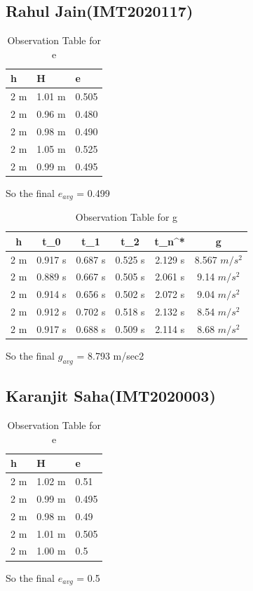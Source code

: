 \documentclass[11pt]{scrartcl} %
\begin{document}
\subsection{Rahul Jain(IMT2020117)}

\begin{table}[h] %
	\centering %
	\begin{tabular}{l l l}
		\toprule
		\textbf{h} & \textbf{H} & \textbf{e} \\
		\midrule
		2 m & 1.01 m & 0.505\\
        2 m & 0.96 m  & 0.480\\
        2 m & 0.98 m  & 0.490\\
        2 m & 1.05 m & 0.525 \\
        2 m & 0.99 m & 0.495 \\
		\bottomrule
	\end{tabular}
	\caption{Observation Table for e}
\end{table}
So the final $e_{avg}$ = 0.499

\begin{table}[h]
\centering
\begin{tabular}{||c c c c c c||} 
\toprule
 \hline
 h & t_0 & t_1 & t_2 & t_n^* & g \\ [0.5ex] 
 \midrule
 \hline\hline
 2 m & 0.917 s & 0.687 s  & 0.525 s & 2.129 s & 8.567 $m/s^2$  \\ 
 \hline
 2 m & 0.889 s & 0.667 s & 0.505 s & 2.061 s & 9.14 $m/s^2$  \\
 \hline 
 2 m & 0.914 s & 0.656 s & 0.502 s & 2.072 s  & 9.04 $m/s^2$   \\
 \hline
 2 m & 0.912 s & 0.702 s & 0.518 s & 2.132 s  & 8.54 $m/s^2$   \\
 \hline
 2 m & 0.917 s & 0.688 s & 0.509 s & 2.114 s  & 8.68 $m/s^2$  \\ 
 [1ex]
 \bottomrule
 \hline
\end{tabular}
\caption{Observation Table for g}
\end{table}
So the final $g_{avg}$ = 8.793 m/sec2
\newpage
\subsection{Karanjit Saha(IMT2020003)}

\begin{table}[h] %
	\centering %
	\begin{tabular}{l l l}
		\toprule
		\textbf{h} & \textbf{H} & \textbf{e} \\
		\midrule
		2 m & 1.02 m & 0.51\\
		2 m & 0.99 m  & 0.495\\
		2 m & 0.98 m  & 0.49\\
		2 m & 1.01 m & 0.505 \\
		2 m & 1.00 m & 0.5 \\
		\bottomrule
	\end{tabular}
	\caption{Observation Table for e}
\end{table}
So the final $e_{avg}$ = 0.5
\end{document}
